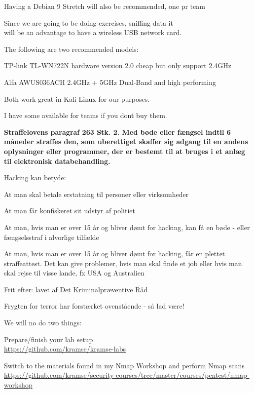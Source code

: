 \documentclass[Screen16to9,17pt]{foils}
\begin{document}
\centerline{Having a Debian 9 Stretch will also be recommended, one pr team}


Since we are going to be doing exercises, sniffing data it \\
will be an advantage to have a wireless USB network card.
\begin{list2}
\item The following are two recommended models:
\item TP-link TL-WN722N hardware version 2.0 cheap but only support 2.4GHz
\item Alfa AWUS036ACH 2.4GHz + 5GHz Dual-Band and high performing
\item   Both work great in Kali Linux for our purposes.
\end{list2}

I have some available for teams if you dont buy them.



\vskip 1cm
{\bfseries Straffelovens paragraf 263 Stk. 2. Med bøde eller fængsel
  indtil 6 måneder
straffes den, som uberettiget skaffer sig adgang til en andens
oplysninger eller programmer, der er bestemt til at bruges i et anlæg
til elektronisk databehandling.}

Hacking kan betyde:
\begin{list2}
\item At man skal betale erstatning til personer eller virksomheder
\item At man får konfiskeret sit udstyr af politiet
\item At man, hvis man er over 15 år og bliver dømt for hacking, kan
  få en bøde - eller fængselsstraf i alvorlige tilfælde
\item At man, hvis man er over 15 år og bliver dømt for hacking, får
en plettet straffeattest. Det kan give problemer, hvis man skal finde
et job eller hvis man skal rejse til visse lande, fx USA og
Australien
\item Frit efter:  lavet af Det
  Kriminalpræventive Råd
\item Frygten for terror har forstærket ovenstående - så lad være!
\end{list2}





\begin{list2}
\item We will no do two things:
\item Prepare/finish your lab setup\\
\url{https://github.com/kramse/kramse-labs}

\item Switch to the materials found in my Nmap Workshop and perform Nmap scans\\
\url{https://github.com/kramse/security-courses/tree/master/courses/pentest/nmap-workshop}
\end{list2}
\end{document}
